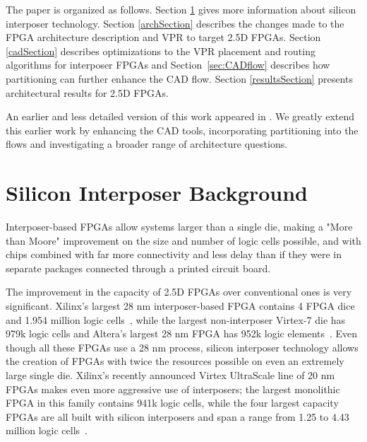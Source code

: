 \documentclass[journal]{IEEEtran}
\begin{document}
The paper is organized as follows. Section \ref{siliconSection} gives more information about silicon interposer technology. Section \ref{archSection} describes the changes made to the FPGA architecture description and VPR to target 2.5D FPGAs. Section \ref{cadSection} describes optimizations to the VPR placement and routing algorithms for interposer FPGAs and Section~\ref{sec:CADflow} describes how partitioning can further enhance the CAD flow. Section \ref{resultsSection} presents architectural results for 2.5D FPGAs.

An earlier and less detailed version of this work appeared in \cite{interposer2014}. We greatly extend this earlier work by enhancing the CAD tools, incorporating partitioning into the flows and investigating a broader range of architecture questions. 


\section{Silicon Interposer Background}
\label{siliconSection}

Interposer-based FPGAs allow systems larger than a single die, making a "More than Moore" improvement on the size and number of logic cells possible, and with chips combined with far more connectivity and less delay than if they were in separate packages connected through a printed circuit board. 

The improvement in the capacity of 2.5D FPGAs over conventional ones is very significant. Xilinx's largest 28 nm interposer-based FPGA contains 4 FPGA dice and 1.954 million logic cells~\cite{xilinx7series}, while the largest non-interposer Virtex-7 die has 979k logic cells and Altera's largest 28 nm FPGA has 952k logic elements~\cite{stratixV}. Even though all these FPGAs use a 28 nm process, silicon interposer technology allows the creation of FPGAs with twice the resources possible on even an extremely large single die. Xilinx's recently announced Virtex UltraScale line of 20 nm FPGAs makes even more aggressive use of interposers; the largest monolithic FPGA in this family contains 941k logic cells, while the four largest capacity FPGAs are all built with silicon interposers and span a range from 1.25 to 4.43 million logic cells~\cite{virtexultrascale}.
\end{document}
